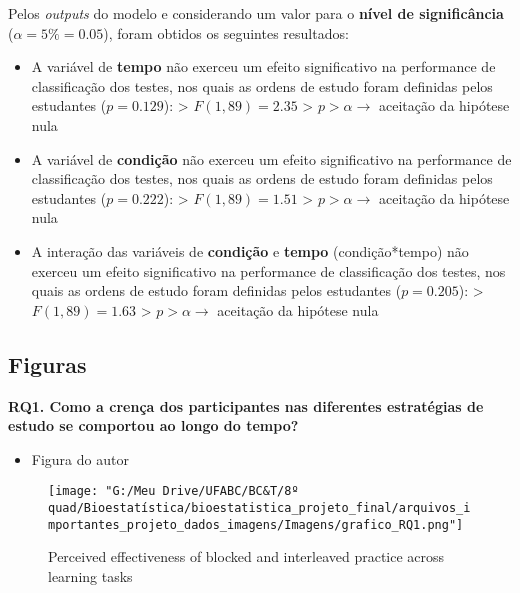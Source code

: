 \documentclass[
]{article}
\providecommand{\tightlist}{%
  \setlength{\itemsep}{0pt}\setlength{\parskip}{0pt}}
\begin{document}
Pelos \emph{outputs} do modelo e considerando um valor para o
\textbf{nível de significância} (\(\alpha = 5\% = 0.05\)), foram obtidos
os seguintes resultados:

\begin{itemize}
\tightlist
\item
  A variável de \textbf{tempo} não exerceu um efeito significativo na
  performance de classificação dos testes, nos quais as ordens de estudo
  foram definidas pelos estudantes (\(p = 0.129\)): \textgreater{}
  \(F(1, 89) = 2.35\) \textgreater{} \(p > \alpha →\) aceitação da
  hipótese nula
\end{itemize}

\begin{itemize}
\tightlist
\item
  A variável de \textbf{condição} não exerceu um efeito significativo na
  performance de classificação dos testes, nos quais as ordens de estudo
  foram definidas pelos estudantes (\(p = 0.222\)): \textgreater{}
  \(F(1, 89) = 1.51\) \textgreater{} \(p > \alpha →\) aceitação da
  hipótese nula
\end{itemize}

\begin{itemize}
\tightlist
\item
  A interação das variáveis de \textbf{condição} e \textbf{tempo}
  (condição*tempo) não exerceu um efeito significativo na performance de
  classificação dos testes, nos quais as ordens de estudo foram
  definidas pelos estudantes (\(p = 0.205\)): \textgreater{}
  \(F(1, 89) = 1.63\) \textgreater{} \(p > \alpha →\) aceitação da
  hipótese nula
\end{itemize}

\subsection{Figuras}\label{figuras}

\textbf{RQ1. Como a crença dos participantes nas diferentes estratégias
de estudo se comportou ao longo do tempo?}

\begin{itemize}
\tightlist
\item
  Figura do autor
\end{itemize}

\begin{figure}
\centering
\texttt{[image: "G:/Meu Drive/UFABC/BC\&T/8º quad/Bioestatística/bioestatistica\_projeto\_final/arquivos\_importantes\_projeto\_dados\_imagens/Imagens/grafico\_RQ1.png"]}
\caption{Perceived effectiveness of blocked and interleaved practice
across learning tasks}
\end{figure}
\end{document}
